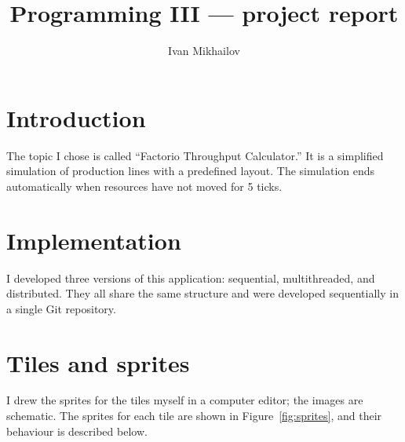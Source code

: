 \documentclass[sigconf,nonacm]{acmart}
\begin{document}
\title{Programming III --- project report}

\author{Ivan Mikhailov}

\maketitle

\section{Introduction}
The topic I chose is called “Factorio Throughput Calculator.” It is a simplified simulation of production lines with a predefined layout. The simulation ends automatically when resources have not moved for 5 ticks.

\section{Implementation}
I developed three versions of this application: sequential, multithreaded, and distributed.
They all share the same structure and were developed sequentially in a single Git repository.

\section{Tiles and sprites}
I drew the sprites for the tiles myself in a computer editor; the images are schematic. The sprites for each tile are shown in Figure~\ref{fig:sprites}, and their behaviour is described below.
\end{document}
